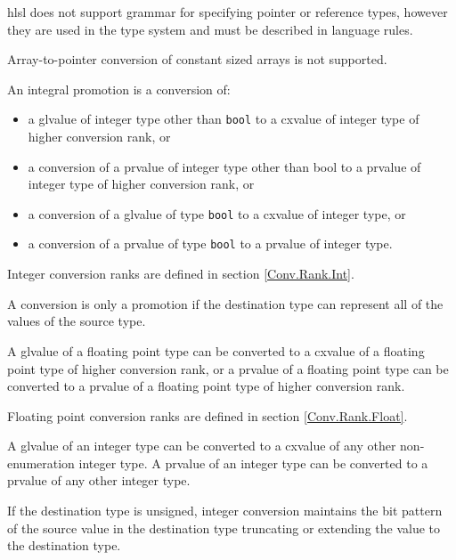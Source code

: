 \begin{note}
  \acrshort{hlsl} does not support grammar for specifying pointer or reference
  types, however they are used in the type system and must be described in
  language rules.
\end{note}

\begin{note}
  Array-to-pointer conversion of constant sized arrays is not supported.
\end{note}


\p An integral promotion is a conversion of:
\begin{itemize}
  \item a glvalue of integer type other than \texttt{bool} to a cxvalue of
  integer type of higher conversion rank, or
  \item a conversion of a prvalue of integer type other than bool to a prvalue
  of integer type of higher conversion rank, or
  \item a conversion of a glvalue of type \texttt{bool} to a cxvalue of integer
  type, or
  \item a conversion of a prvalue of type \texttt{bool} to a prvalue of integer
  type.
\end{itemize}

\p Integer conversion ranks are defined in section \ref{Conv.Rank.Int}.

\p A conversion is only a promotion if the destination type can represent all of
the values of the source type.


\p A glvalue of a floating point type can be converted to a cxvalue of a
floating point type of higher conversion rank, or a prvalue of a floating point
type can be converted to a prvalue of a floating point type of higher conversion
rank.

\p Floating point conversion ranks are defined in section \ref{Conv.Rank.Float}.


\p A glvalue of an integer type can be converted to a cxvalue of any other
non-enumeration integer type. A prvalue of an integer type can be converted to a
prvalue of any other integer type.

\p If the destination type is unsigned, integer conversion maintains the bit
pattern of the source value in the destination type truncating or extending the
value to the destination type.

